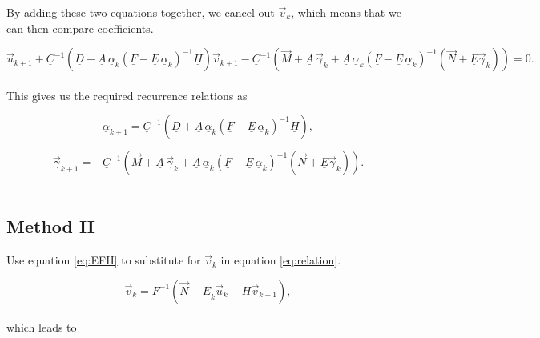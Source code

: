 \documentclass[11pt]{amsart}
\begin{document}
By adding these two equations together, we cancel out $\vec{v}_{k}$, which means that we can then compare coefficients.

\begin{equation} \label{eq:If}
 \vec{u}_{k+1} + \underline{C}^{-1} \left( \underline{D}  +  \underline{A} \, \underline{\alpha}_{k} \left( \underline{F} - \underline{E} \, \underline{\alpha}_{k} \right)^{-1}  \underline{H}  \right) \vec{v}_{k+1}   -  \underline{C}^{-1}  \left( \vec{M}   + \underline{A} \, \vec{\gamma}_{k}  +  \underline{A} \, \underline{\alpha}_{k} \left( \underline{F} - \underline{E} \, \underline{\alpha}_{k} \right)^{-1} \left(  \vec{N} + \underline{E} \vec{\gamma}_{k} \right)   \right)  =  0  .
\end{equation} 
\\

This gives us the required recurrence relations as

\begin{equation} \label{eq:Ialpha}
\underline{\alpha}_{k+1}  =  \underline{C}^{-1} \left( \underline{D}  +  \underline{A} \, \underline{\alpha}_{k} \left( \underline{F} - \underline{E} \, \underline{\alpha}_{k} \right)^{-1}  \underline{H}  \right) ,
\end{equation} 

\begin{equation} \label{eq:Igamma}
\vec{\gamma}_{k+1}  =  -  \underline{C}^{-1}  \left( \vec{M}   + \underline{A} \, \vec{\gamma}_{k}  +  \underline{A} \, \underline{\alpha}_{k} \left( \underline{F} - \underline{E} \, \underline{\alpha}_{k} \right)^{-1} \left(  \vec{N} + \underline{E} \vec{\gamma}_{k} \right)   \right) .
\end{equation} 
\\






\subsection{Method II}

Use equation \ref{eq:EFH} to substitute for $\vec{v}_{k}$ in equation \ref{eq:relation}.

\begin{equation} \label{eq:IIa}
\vec{v}_{k}  = \underline{F}^{-1}  \left( \vec{N} - \underline{E}_{k}  \vec{u}_{k}  - \underline{H} \vec{v}_{k+1} \right),
\end{equation}
\\
which leads to
\end{document}

